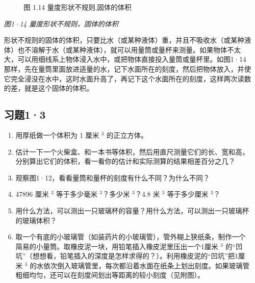 \begin{figure}
{%
}
\caption{图 1.14 量度形状不规则,固体的体积}
\end{figure}

\emph{图1·14 量度形状不规则，固体的体积}

形状不规则的固体的体积，只要比水（或某种液体）重，并且不吸收水（或某种液体）也不溶解于水（或某种液体），就可以用量筒或量杯来测量。如果物体不太大，可以用细线系上物体浸入水中，或把物体直接投入量筒或量杯里。如图1·14那样，先在量筒里面放进适量的水，记下水面所在的刻度，然后把物体放入，并使它完全浸没在水中，这时水面升高了，再记下这个水面所在的刻度，这样两次读数的差，就是这个固体的体积。

\subsection{习题1·3}\label{ux4e60ux989813}

\begin{enumerate}
\def\labelenumi{\arabic{enumi}.}
\item
  用厚纸做一个体积为 1 厘米 \(^{3}\) 的正立方体。
\item
  估计一下一个火柴盒、和一本书等体积，然后用直尺测量它们的长、宽和高，分别算出它们的体积，看一看你的估计和实际测算的结果相差百分之几？
\item
  观察图1·12，看看量筒和量杯的刻度有什么不同？为什么不同？
\item
  47896 厘米 \(^{3}\) 等于多少毫米 \(^{3}\)？多少米 \(^{3}\)？4.8 米
  \(^{3}\) 等于多少厘米 \(^{3}\)？
\item
  用什么方法，可以测出一只玻璃杯的容量？用什么方法，可以测出一只玻璃杯的玻璃体积？
\item
  取一个有底的小玻璃管（如装药片的小玻璃管），管外糊上狭纸条，制作一个简易的小量筒。取橡皮泥一块，用铅笔插入橡皮泥里压出一个1厘米
  \(^{3}\)
  的``凹坑''（想想看，铅笔插入的深度是怎样求得的？）。利用橡皮泥的``凹坑''把1厘米
  \(^{3}\)
  的水依次倒入玻璃管里，每次都沿着水面在纸条上划出刻度。如果玻璃管粗细均匀，还可以在刻度间划出等距离的较小刻度（见附图）。
\end{enumerate}

